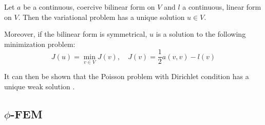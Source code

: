 
\begin{Prop}
	
	Let $a$ be a continuous, coercive bilinear form on $V$ and $l$ a continuous, linear form on $V$. Then the variational problem has a unique solution $u\in V$. 
	
	Moreover, if the bilinear form is symmetrical, $u$ is a solution to the following minimization problem:
	\begin{equation*}
		J(u)=\min_{v\in V} J(v), \quad J(v)=\frac{1}{2}a(v,v)-l(v)
	\end{equation*}
\end{Prop}

It can then be shown that the Poisson problem with Dirichlet condition has a unique weak solution .





\newpage

\subsection{$\phi$-FEM}


